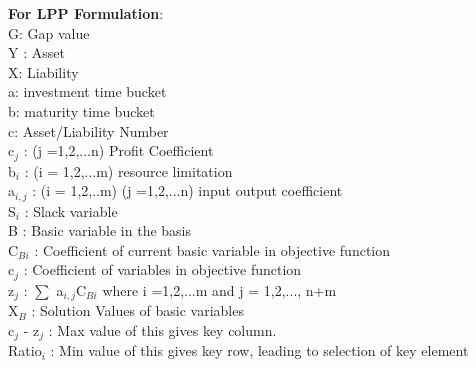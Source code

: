 {\bf For LPP Formulation}:\\
G: Gap value\\
Y : Asset\\
X: Liability\\
a: investment time bucket\\
b: maturity time bucket\\
c: Asset/Liability Number\\
c$_{j}$ : (j =1,2,...n) Profit Coefficient \\
b$_{i}$ : (i = 1,2,...m) resource limitation \\
a$_{i,j}$ : (i = 1,2,..m) (j =1,2,...n) input output coefficient \\ 
S$_{i}$ : Slack variable \\ 
B : Basic variable in the basis \\ 
C$_{Bi}$ : Coefficient of current basic variable in objective function \\ 
c$_{j}$ : Coefficient of variables in objective function \\ 
z$_{j}$ : $\sum$ a$_{i,j}$C$_{Bi}$ where i =1,2,...m and j = 1,2,..., n+m \\ 
X$_{B}$ :  Solution Values of basic variables \\ 
c$_{j}$ - z$_{j}$ : Max value of this gives key column. \\ 
Ratio$_{i}$ : Min value of this gives key row, leading to selection of key element \\ 


